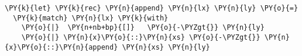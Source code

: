 \begin{Verbatim}[commandchars=\\\{\}]
\PY{k}{let} \PY{k}{rec} \PY{n}{append} \PY{n}{lx} \PY{n}{ly} \PY{o}{=}
  \PY{k}{match} \PY{n}{lx} \PY{k}{with}
    \PY{o}{|}  \PY{n+nb+bp}{[]}   \PY{o}{-\PYZgt{}} \PY{n}{ly}
    \PY{o}{|} \PY{n}{x}\PY{o}{::}\PY{n}{xs} \PY{o}{-\PYZgt{}} \PY{n}{x}\PY{o}{::}\PY{n}{append} \PY{n}{xs} \PY{n}{ly}
\end{Verbatim}
